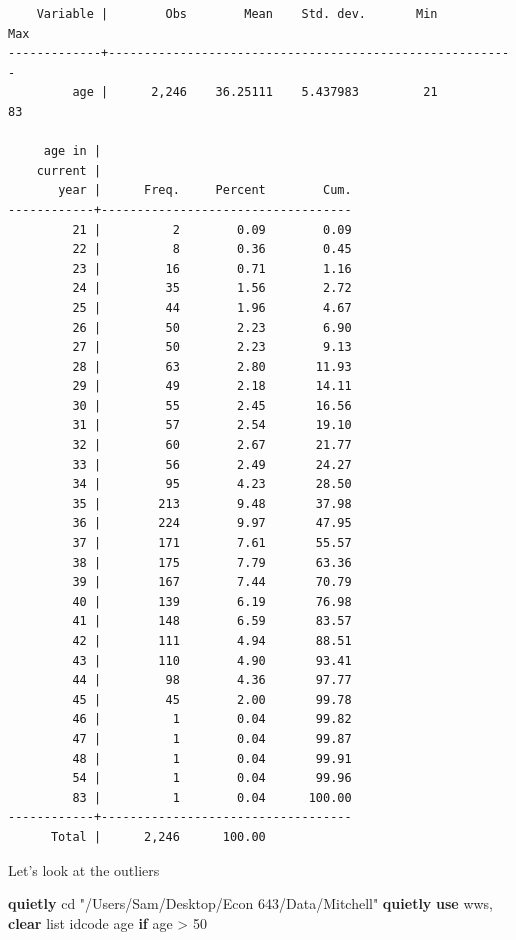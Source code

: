 \documentclass[
]{book}
\newenvironment{Shaded}{\begin{snugshade}}{\end{snugshade}}
\newcommand{\KeywordTok}[1]{\textcolor[rgb]{0.13,0.29,0.53}{\textbf{#1}}}
\newcommand{\NormalTok}[1]{#1}
\newcommand{\OtherTok}[1]{\textcolor[rgb]{0.56,0.35,0.01}{#1}}
\newcommand{\StringTok}[1]{\textcolor[rgb]{0.31,0.60,0.02}{#1}}
\begin{document}
\begin{verbatim}
    Variable |        Obs        Mean    Std. dev.       Min        Max
-------------+---------------------------------------------------------
         age |      2,246    36.25111    5.437983         21         83

     age in |
    current |
       year |      Freq.     Percent        Cum.
------------+-----------------------------------
         21 |          2        0.09        0.09
         22 |          8        0.36        0.45
         23 |         16        0.71        1.16
         24 |         35        1.56        2.72
         25 |         44        1.96        4.67
         26 |         50        2.23        6.90
         27 |         50        2.23        9.13
         28 |         63        2.80       11.93
         29 |         49        2.18       14.11
         30 |         55        2.45       16.56
         31 |         57        2.54       19.10
         32 |         60        2.67       21.77
         33 |         56        2.49       24.27
         34 |         95        4.23       28.50
         35 |        213        9.48       37.98
         36 |        224        9.97       47.95
         37 |        171        7.61       55.57
         38 |        175        7.79       63.36
         39 |        167        7.44       70.79
         40 |        139        6.19       76.98
         41 |        148        6.59       83.57
         42 |        111        4.94       88.51
         43 |        110        4.90       93.41
         44 |         98        4.36       97.77
         45 |         45        2.00       99.78
         46 |          1        0.04       99.82
         47 |          1        0.04       99.87
         48 |          1        0.04       99.91
         54 |          1        0.04       99.96
         83 |          1        0.04      100.00
------------+-----------------------------------
      Total |      2,246      100.00
\end{verbatim}

Let's look at the outliers

\begin{Shaded}
\begin{Highlighting}[]
\KeywordTok{quietly}\NormalTok{ cd }\StringTok{"/Users/Sam/Desktop/Econ 643/Data/Mitchell"}
\KeywordTok{quietly} \KeywordTok{use}\NormalTok{ wws, }\KeywordTok{clear}
\OtherTok{list}\NormalTok{ idcode age }\KeywordTok{if}\NormalTok{ age \textgreater{} 50}
\end{Highlighting}
\end{Shaded}
\end{document}
